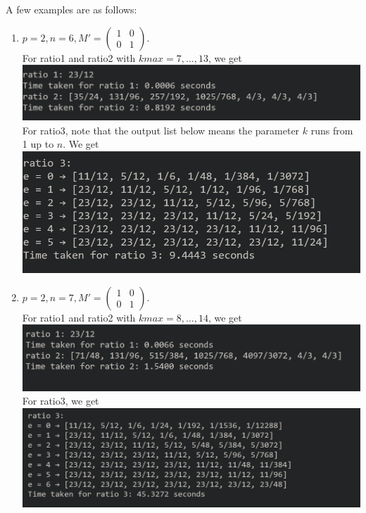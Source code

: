 \documentclass[letterpaper,12pt]{article}
\begin{document}
A few examples are as follows:
\begin{enumerate}
\item $p=2, n=6, M' = \begin{pmatrix}
1 & 0 \\ 0 & 1
\end{pmatrix}.$ \\
For ratio1 and ratio2 with $kmax = 7, \dots, 13$, we get \\
\includegraphics[scale=0.5]{ex1_1.png} \\
For ratio3, note that the output list below means 
the parameter $k$ runs from 1 up to $n$.
We get \\
\includegraphics[scale=0.5]{ex1_2.png}

\item $p=2, n=7, M' = \begin{pmatrix}
1 & 0 \\ 0 & 1
\end{pmatrix}.$ \\
For ratio1 and ratio2 with $kmax = 8, \dots, 14$, we get \\
\includegraphics[scale=0.5]{ex2_1.png} \\
For ratio3, we get \\
\includegraphics[scale=0.5]{ex2_2.png}


\end{enumerate}
\end{document}
